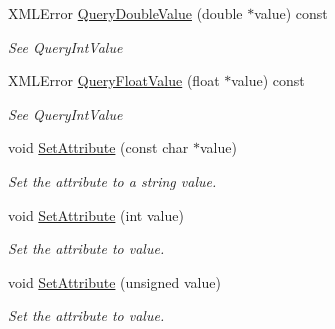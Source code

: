\begin{DoxyCompactItemize}
X\+M\+L\+Error \hyperlink{classtinyxml2_1_1_x_m_l_attribute_a2aa6e55e8ea03af0609cf6690bff79b9}{Query\+Double\+Value} (double $\ast$value) const
\begin{DoxyCompactList}\small\item\em See Query\+Int\+Value \end{DoxyCompactList}\item 
\mbox{\label{classtinyxml2_1_1_x_m_l_attribute_a049dea6449a6259b6cfed44a9427b607}} 
X\+M\+L\+Error \hyperlink{classtinyxml2_1_1_x_m_l_attribute_a049dea6449a6259b6cfed44a9427b607}{Query\+Float\+Value} (float $\ast$value) const
\begin{DoxyCompactList}\small\item\em See Query\+Int\+Value \end{DoxyCompactList}\item 
\mbox{\label{classtinyxml2_1_1_x_m_l_attribute_a406d2c4a13c7af99a65edb59dd9f7581}} 
void \hyperlink{classtinyxml2_1_1_x_m_l_attribute_a406d2c4a13c7af99a65edb59dd9f7581}{Set\+Attribute} (const char $\ast$value)
\begin{DoxyCompactList}\small\item\em Set the attribute to a string value. \end{DoxyCompactList}\item 
\mbox{\label{classtinyxml2_1_1_x_m_l_attribute_ad86d7d7058d76761c3a80662566a57e5}} 
void \hyperlink{classtinyxml2_1_1_x_m_l_attribute_ad86d7d7058d76761c3a80662566a57e5}{Set\+Attribute} (int value)
\begin{DoxyCompactList}\small\item\em Set the attribute to value. \end{DoxyCompactList}\item 
\mbox{\label{classtinyxml2_1_1_x_m_l_attribute_ae70468c0f6df2748ba3529c716999fae}} 
void \hyperlink{classtinyxml2_1_1_x_m_l_attribute_ae70468c0f6df2748ba3529c716999fae}{Set\+Attribute} (unsigned value)
\begin{DoxyCompactList}\small\item\em Set the attribute to value. \end{DoxyCompactList}\item 
\mbox{\label{classtinyxml2_1_1_x_m_l_attribute_a7c1240f479722b9aa29b6c030aa116c2}} 

\end{DoxyCompactItemize}
